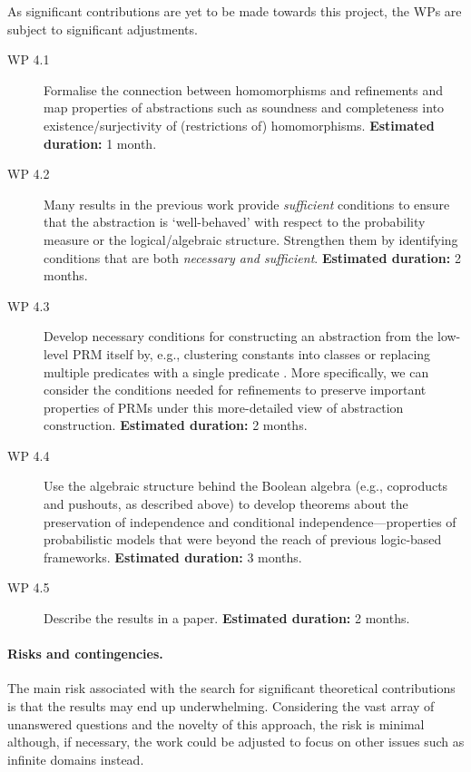 \documentclass{article}
\begin{document}
As significant contributions are yet to be made towards this project, the WPs
are subject to significant adjustments.
\begin{description}
\item[WP 4.1] Formalise the connection between homomorphisms and refinements
and map properties of abstractions such as soundness and completeness into
  existence/surjectivity of (restrictions of) homomorphisms. {\bf Estimated
    duration:} 1 month.
\item[WP 4.2] Many results in the previous work
  \cite{DBLP:journals/corr/abs-1810-02434} provide \emph{sufficient} conditions
  to ensure that the abstraction is `well-behaved' with respect to the
  probability measure or the logical/algebraic structure. Strengthen them by
  identifying conditions that are both \emph{necessary and sufficient}. {\bf
    Estimated duration:} 2 months.
\item[WP 4.3] Develop necessary conditions for constructing an abstraction from
  the low-level PRM itself by, e.g., clustering constants into classes or
  replacing multiple predicates with a single predicate
  \cite{DBLP:journals/ai/GiunchigliaW92}. More specifically, we can consider the
  conditions needed for refinements to preserve important properties of PRMs
  under this more-detailed view of abstraction construction. {\bf Estimated
    duration:} 2 months.
\item[WP 4.4] Use the algebraic structure behind the Boolean algebra (e.g.,
  coproducts and pushouts, as described above) to develop theorems about the
  preservation of independence and conditional independence---properties of
  probabilistic models that were beyond the reach of previous logic-based
  frameworks. {\bf Estimated duration:} 3 months.
\item[WP 4.5] Describe the results in a paper. {\bf Estimated duration:} 2
  months.
\end{description}

\paragraph{Risks and contingencies.} The main risk associated with the search
for significant theoretical contributions is that the results may end up
underwhelming. Considering the vast array of unanswered questions and the
novelty of this approach, the risk is minimal although, if necessary, the work
could be adjusted to focus on other issues such as infinite domains instead.
\end{document}
